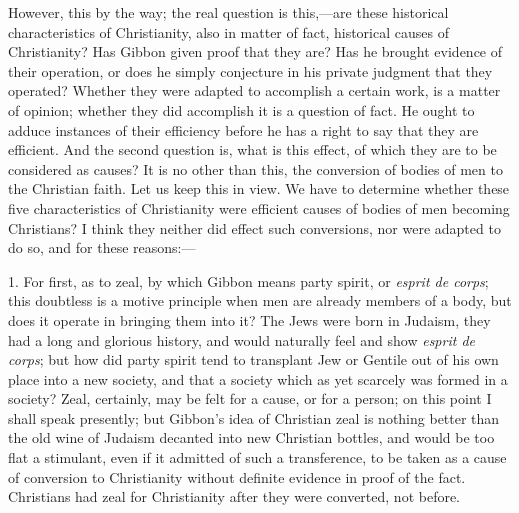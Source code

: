 However, this by the way; the real question is this,—are these
historical characteristics of Christianity, also in matter of fact,
historical causes of Christianity? Has Gibbon given proof that they
are? Has he brought evidence of their operation, or does he simply
conjecture in his private judgment that they operated? Whether they
were adapted to accomplish a certain work, is a matter of opinion;
whether they did accomplish it is a question of fact. He ought to
adduce instances of their efficiency before he has a right to say that
they are efficient. And the second question is, what is this effect,
of which they are to be considered as causes? It is no other than
this, the conversion of bodies of men to the Christian faith. Let us
keep this in view. We have to determine whether these five
characteristics of Christianity were efficient causes of bodies of men
becoming Christians? I think they neither did effect such
conversions, nor were adapted to do so, and for these reasons:—

1. For first, as to zeal, by which Gibbon means party spirit, or \emph{esprit
de corps}; this doubtless is a motive principle when men are
already members of a body, but does it operate in bringing them into
it? The Jews were born in Judaism, they had a long and glorious
history, and would naturally feel and show \emph{esprit de corps}; but
how did party spirit tend to transplant Jew or Gentile out of his own
place into a new society, and that a society which as yet scarcely was
formed in a society? Zeal, certainly, may be felt for a cause, or for
a person; on this point I shall speak presently; but Gibbon's idea of
Christian zeal is nothing better than the old wine of Judaism decanted
into new Christian bottles, and would be too flat a stimulant, even if
it admitted of such a transference, to be taken as a cause of
conversion to Christianity without definite evidence in proof of the
fact. Christians had zeal for Christianity after they were converted,
not before.

